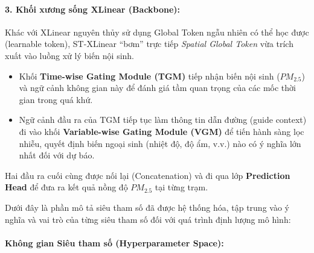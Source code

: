 \paragraph{3. Khối xương sống XLinear (Backbone):}
Khác với XLinear nguyên thủy sử dụng Global Token ngẫu nhiên có thể học được (learnable token), ST-XLinear ``bơm'' trực tiếp \textit{Spatial Global Token} vừa trích xuất vào luồng xử lý biến nội sinh. 
\begin{itemize}
    \item Khối \textbf{Time-wise Gating Module (TGM)} tiếp nhận biến nội sinh ($PM_{2.5}$) và ngữ cảnh không gian này để đánh giá tầm quan trọng của các mốc thời gian trong quá khứ.
    \item Ngữ cảnh đầu ra của TGM tiếp tục làm thông tin dẫn đường (guide context) đi vào khối \textbf{Variable-wise Gating Module (VGM)} để tiến hành sàng lọc nhiễu, quyết định biến ngoại sinh (nhiệt độ, độ ẩm, v.v.) nào có ý nghĩa lớn nhất đối với dự báo.
\end{itemize}
Hai đầu ra cuối cùng được nối lại (Concatenation) và đi qua lớp \textbf{Prediction Head} để đưa ra kết quả nồng độ $PM_{2.5}$ tại từng trạm.

Dưới đây là phần mô tả siêu tham số đã được hệ thống hóa, tập trung vào ý nghĩa và vai trò của từng siêu tham số đối với quá trình định lượng mô hình:

\paragraph{Không gian Siêu tham số (Hyperparameter Space):}

